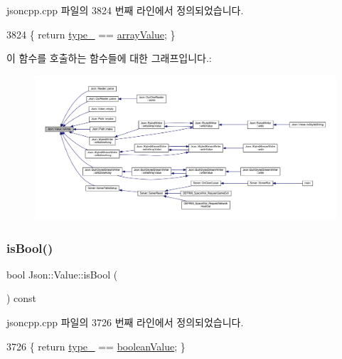 jsoncpp.\+cpp 파일의 3824 번째 라인에서 정의되었습니다.


\begin{DoxyCode}
3824 \{ \textcolor{keywordflow}{return} \hyperlink{class_json_1_1_value_abd222c2536dc88bf330dedcd076d2356}{type\_} == \hyperlink{namespace_json_a7d654b75c16a57007925868e38212b4eadc8f264f36b55b063c78126b335415f4}{arrayValue}; \}
\end{DoxyCode}
이 함수를 호출하는 함수들에 대한 그래프입니다.\+:\nopagebreak
\begin{figure}[H]
\begin{center}
\leavevmode
\includegraphics[width=350pt]{class_json_1_1_value_a1627eb9d6568d6d0252fa8bb711c0a59_icgraph}
\end{center}
\end{figure}
\mbox{\label{class_json_1_1_value_ab1f02651cb89d0f18b63a036959391ba}} 
\subsubsection{\texorpdfstring{is\+Bool()}{isBool()}}
{\footnotesize\ttfamily bool Json\+::\+Value\+::is\+Bool (\begin{DoxyParamCaption}{ }\end{DoxyParamCaption}) const}



jsoncpp.\+cpp 파일의 3726 번째 라인에서 정의되었습니다.


\begin{DoxyCode}
3726 \{ \textcolor{keywordflow}{return} \hyperlink{class_json_1_1_value_abd222c2536dc88bf330dedcd076d2356}{type\_} == \hyperlink{namespace_json_a7d654b75c16a57007925868e38212b4ea14c30dbf4da86f7b809be299f671f7fd}{booleanValue}; \}
\end{DoxyCode}
\mbox{\label{class_json_1_1_value_af1ee6be27a96a7d12128efdd60deb54d}} 
